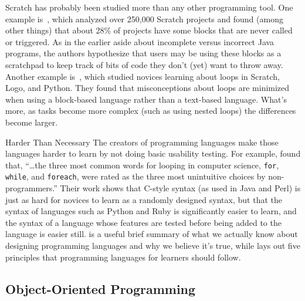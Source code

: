 Scratch has probably been studied more than any other programming tool.
One example is~\cite{Aiva2016},
which analyzed over 250,000 Scratch projects
and found (among other things) that about 28\% of projects have some blocks that are never called or triggered.
As in the earlier aside about incomplete versus incorrect Java programs,
the authors hypothesize that users may be using these blocks as a scratchpad
to keep track of bits of code they don't (yet) want to throw away.
Another example is~\cite{Grov2017,Mlad2017},
which studied novices learning about loops in Scratch, Logo, and Python.
They found that misconceptions about loops are minimized when using a block-based language
rather than a text-based language.
What's more,
as tasks become more complex (such as using nested loops)
the differences become larger.

\begin{aside}{Harder Than Necessary}
  The creators of programming languages make those languages harder to learn by not doing basic usability testing.
  For example,
  \cite{Stef2013} found that,
  ``{\ldots}the three most common words for looping in computer science,
  \texttt{for}, \texttt{while}, and \texttt{foreach},
  were rated as the three most unintuitive choices by non-programmers.''
  Their work shows that C-style syntax (as used in Java and Perl)
  is just as hard for novices to learn as a randomly designed syntax,
  but that the syntax of languages such as Python and Ruby
  is significantly easier to learn,
  and the syntax of a language whose features are tested before being added to the language is easier still.
  \cite{Stef2017} is a useful brief summary of what we actually know about designing programming languages
  and why we believe it's true,
  while \cite{Guzd2016} lays out five principles that programming languages for learners should follow.
\end{aside}

\subsection*{Object-Oriented Programming}

